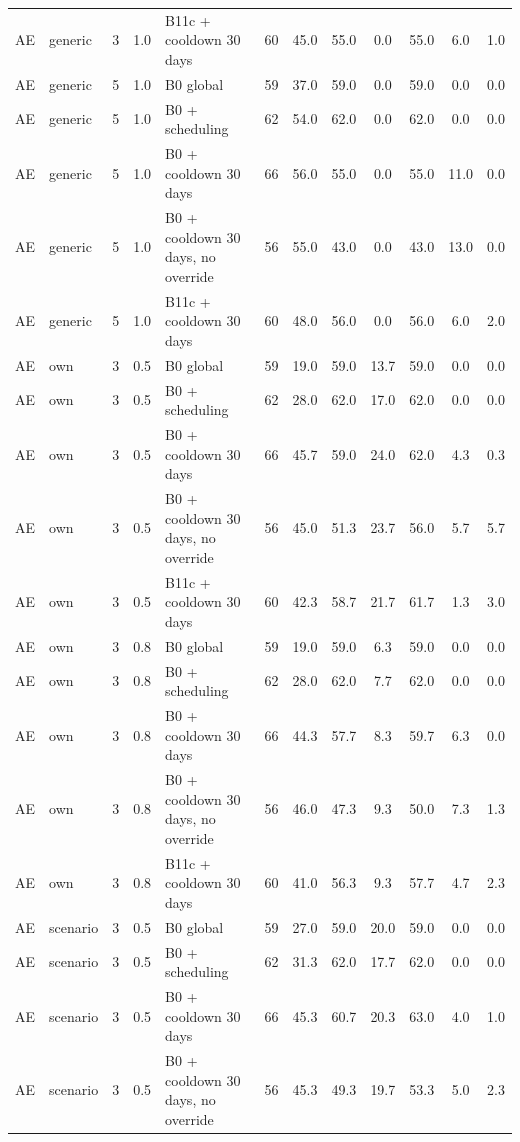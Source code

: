 \documentclass[10pt,onecolumn,letterpaper]{article}
\begin{document}
\begin{longtable}{lllllccccccc}
AE & generic & 3 & 1.0 & B11c + cooldown 30 days & 60 & 45.0 & 55.0 & 0.0 & 55.0 & 6.0 & 1.0 \\
AE & generic & 5 & 1.0 & B0 global & 59 & 37.0 & 59.0 & 0.0 & 59.0 & 0.0 & 0.0 \\
AE & generic & 5 & 1.0 & B0 + scheduling & 62 & 54.0 & 62.0 & 0.0 & 62.0 & 0.0 & 0.0 \\
AE & generic & 5 & 1.0 & B0 + cooldown 30 days & 66 & 56.0 & 55.0 & 0.0 & 55.0 & 11.0 & 0.0 \\
AE & generic & 5 & 1.0 & B0 + cooldown 30 days, no override & 56 & 55.0 & 43.0 & 0.0 & 43.0 & 13.0 & 0.0 \\
AE & generic & 5 & 1.0 & B11c + cooldown 30 days & 60 & 48.0 & 56.0 & 0.0 & 56.0 & 6.0 & 2.0 \\
AE & own & 3 & 0.5 & B0 global & 59 & 19.0 & 59.0 & 13.7 & 59.0 & 0.0 & 0.0 \\
AE & own & 3 & 0.5 & B0 + scheduling & 62 & 28.0 & 62.0 & 17.0 & 62.0 & 0.0 & 0.0 \\
AE & own & 3 & 0.5 & B0 + cooldown 30 days & 66 & 45.7 & 59.0 & 24.0 & 62.0 & 4.3 & 0.3 \\
AE & own & 3 & 0.5 & B0 + cooldown 30 days, no override & 56 & 45.0 & 51.3 & 23.7 & 56.0 & 5.7 & 5.7 \\
AE & own & 3 & 0.5 & B11c + cooldown 30 days & 60 & 42.3 & 58.7 & 21.7 & 61.7 & 1.3 & 3.0 \\
AE & own & 3 & 0.8 & B0 global & 59 & 19.0 & 59.0 & 6.3 & 59.0 & 0.0 & 0.0 \\
AE & own & 3 & 0.8 & B0 + scheduling & 62 & 28.0 & 62.0 & 7.7 & 62.0 & 0.0 & 0.0 \\
AE & own & 3 & 0.8 & B0 + cooldown 30 days & 66 & 44.3 & 57.7 & 8.3 & 59.7 & 6.3 & 0.0 \\
AE & own & 3 & 0.8 & B0 + cooldown 30 days, no override & 56 & 46.0 & 47.3 & 9.3 & 50.0 & 7.3 & 1.3 \\
AE & own & 3 & 0.8 & B11c + cooldown 30 days & 60 & 41.0 & 56.3 & 9.3 & 57.7 & 4.7 & 2.3 \\
AE & scenario & 3 & 0.5 & B0 global & 59 & 27.0 & 59.0 & 20.0 & 59.0 & 0.0 & 0.0 \\
AE & scenario & 3 & 0.5 & B0 + scheduling & 62 & 31.3 & 62.0 & 17.7 & 62.0 & 0.0 & 0.0 \\
AE & scenario & 3 & 0.5 & B0 + cooldown 30 days & 66 & 45.3 & 60.7 & 20.3 & 63.0 & 4.0 & 1.0 \\
AE & scenario & 3 & 0.5 & B0 + cooldown 30 days, no override & 56 & 45.3 & 49.3 & 19.7 & 53.3 & 5.0 & 2.3 \\

\end{longtable}
\end{document}
